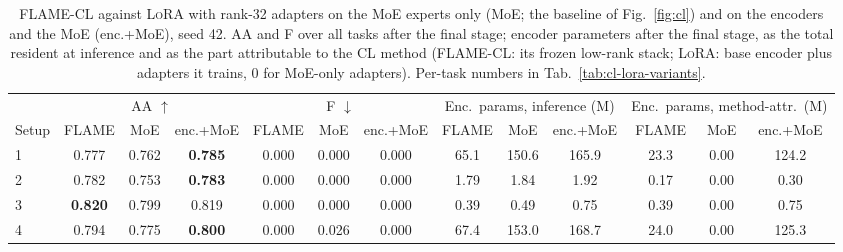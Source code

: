 \begin{table}[t]
\centering
\footnotesize
\setlength{\tabcolsep}{2.0pt}
\caption{\textsc{FLAME-CL} against \textsc{LoRA} with rank-32 adapters on the MoE experts only (MoE; the baseline of Fig.~\ref{fig:cl}) and on the encoders and the MoE (enc.+MoE), seed 42. AA and F over all tasks after the final stage; encoder parameters after the final stage, as the total resident at inference and as the part attributable to the CL method (\textsc{FLAME-CL}: its frozen low-rank stack; \textsc{LoRA}: base encoder plus adapters it trains, 0 for MoE-only adapters). Per-task numbers in Tab.~\ref{tab:cl-lora-variants}.}
\label{tab:cl-lora-variants-summary}
\begin{tabular}{@{}lcccccccccccc@{}}
\toprule
 & \multicolumn{3}{c}{AA $\uparrow$} & \multicolumn{3}{c}{F $\downarrow$} & \multicolumn{3}{c}{Enc.\ params, inference (M)} & \multicolumn{3}{c}{Enc.\ params, method-attr.\ (M)} \\
\cmidrule(lr){2-4}\cmidrule(lr){5-7}\cmidrule(lr){8-10}\cmidrule(lr){11-13}
Setup & \textsc{FLAME} & MoE & enc.+MoE & \textsc{FLAME} & MoE & enc.+MoE & \textsc{FLAME} & MoE & enc.+MoE & \textsc{FLAME} & MoE & enc.+MoE \\
\midrule
1 & 0.777 & 0.762 & \textbf{0.785} & 0.000 & 0.000 & 0.000 & 65.1 & 150.6 & 165.9 & 23.3 & 0.00 & 124.2 \\
2 & 0.782 & 0.753 & \textbf{0.783} & 0.000 & 0.000 & 0.000 & 1.79 & 1.84 & 1.92 & 0.17 & 0.00 & 0.30 \\
3 & \textbf{0.820} & 0.799 & 0.819 & 0.000 & 0.000 & 0.000 & 0.39 & 0.49 & 0.75 & 0.39 & 0.00 & 0.75 \\
4 & 0.794 & 0.775 & \textbf{0.800} & 0.000 & 0.026 & 0.000 & 67.4 & 153.0 & 168.7 & 24.0 & 0.00 & 125.3 \\
\bottomrule
\end{tabular}
\end{table}
